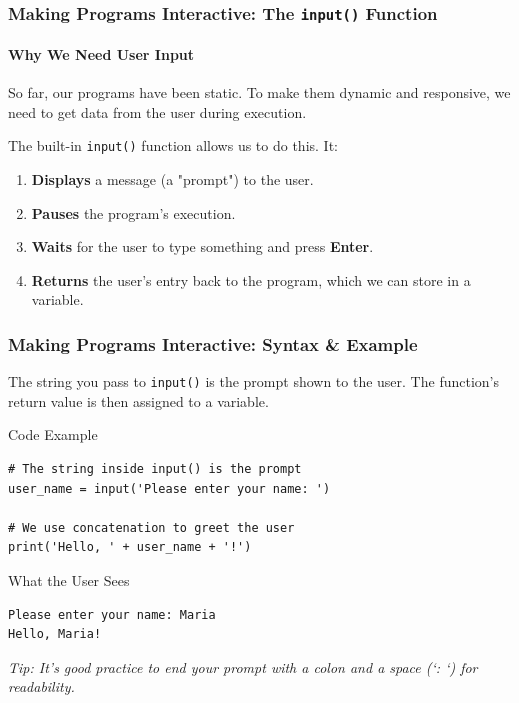 \documentclass{beamer}
\begin{document}
\begin{frame}[fragile]
    \frametitle{Making Programs Interactive: The \texttt{input()} Function}
    \framesubtitle{Why We Need User Input}

    So far, our programs have been static. To make them dynamic and responsive, we need to get data from the user during execution.

    \vspace{1em}

    The built-in \texttt{input()} function allows us to do this. It:
    \begin{enumerate}
        \item \textbf{Displays} a message (a "prompt") to the user.
        \item \textbf{Pauses} the program's execution.
        \item \textbf{Waits} for the user to type something and press \textbf{Enter}.
        \item \textbf{Returns} the user's entry back to the program, which we can store in a variable.
    \end{enumerate}

\end{frame}

\begin{frame}[fragile]
    \frametitle{Making Programs Interactive: Syntax \& Example}

    The string you pass to \texttt{input()} is the prompt shown to the user. The function's return value is then assigned to a variable.

    \begin{block}{Code Example}
\begin{verbatim}
# The string inside input() is the prompt
user_name = input('Please enter your name: ')

# We use concatenation to greet the user
print('Hello, ' + user_name + '!')
\end{verbatim}
    \end{block}

    \begin{block}{What the User Sees}
\begin{verbatim}
Please enter your name: Maria
Hello, Maria!
\end{verbatim}
    \end{block}

    \small{\textit{Tip: It's good practice to end your prompt with a colon and a space (`: `) for readability.}}
\end{frame}
\end{document}
